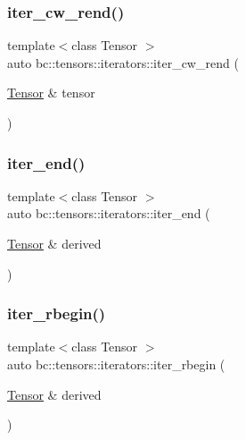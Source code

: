 \mbox{\label{namespacebc_1_1tensors_1_1iterators_aa659f3aedac1544e30c9f6bba811b084}} 
\subsubsection{\texorpdfstring{iter\+\_\+cw\+\_\+rend()}{iter\_cw\_rend()}}
{\footnotesize\ttfamily template$<$class Tensor $>$ \\
auto bc\+::tensors\+::iterators\+::iter\+\_\+cw\+\_\+rend (\begin{DoxyParamCaption}\item[{\hyperlink{namespacebc_a659391e47ab612be3ba6c18cf9c89159}{Tensor} \&}]{tensor }\end{DoxyParamCaption})}

\mbox{\label{namespacebc_1_1tensors_1_1iterators_a150207dbd04324121e494c8745c8c01d}} 
\subsubsection{\texorpdfstring{iter\+\_\+end()}{iter\_end()}}
{\footnotesize\ttfamily template$<$class Tensor $>$ \\
auto bc\+::tensors\+::iterators\+::iter\+\_\+end (\begin{DoxyParamCaption}\item[{\hyperlink{namespacebc_a659391e47ab612be3ba6c18cf9c89159}{Tensor} \&}]{derived }\end{DoxyParamCaption})}

\mbox{\label{namespacebc_1_1tensors_1_1iterators_a3f743f477e49a0711119adb34e56c5fc}} 
\subsubsection{\texorpdfstring{iter\+\_\+rbegin()}{iter\_rbegin()}}
{\footnotesize\ttfamily template$<$class Tensor $>$ \\
auto bc\+::tensors\+::iterators\+::iter\+\_\+rbegin (\begin{DoxyParamCaption}\item[{\hyperlink{namespacebc_a659391e47ab612be3ba6c18cf9c89159}{Tensor} \&}]{derived }\end{DoxyParamCaption})}

